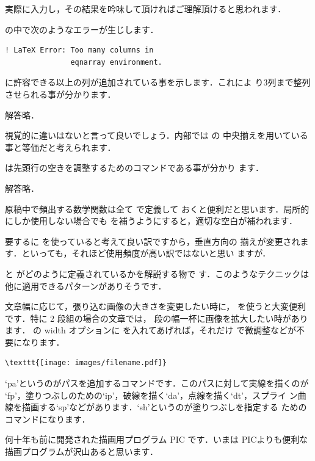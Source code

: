 \begin{description}
実際に入力し，その結果を吟味して頂ければご理解頂けると思われます．

の中で次のようなエラーが生じします．
\begin{verbatim}
! LaTeX Error: Too many columns in 
               eqnarray environment.
\end{verbatim}
 に許容できる以上の列が追加されている事を示します．これによ
 り3列まで整列させられる事が分かります．

解答略．

視覚的に違いはないと言って良いでしょう．内部では の
中央揃えを用いている事と等価だと考えられます．

 は先頭行の空きを調整するためのコマンドである事が分かり
 ます．

解答略．

原稿中で頻出する数学関数は全て  で定義して
おくと便利だと思います．局所的にしか使用しない場合でも 
を補うようにすると，適切な空白が補われます．

 要するに を使っていると考えて良い訳ですから，垂直方向の
 揃えが変更されます．といっても，それほど使用頻度が高い訳ではないと思い
 ますが．
\end{description}

\begin{description}
 と  がどのように定義されているかを解説する物で
す．このようなテクニックは他に適用できるパターンがありそうです．

 文章幅に応じて，張り込む画像の大きさを変更したい時に，
 を使うと大変便利です．特に 2 段組の場合の文章では，
段の幅一杯に画像を拡大したい時があります．
の width オプションに  を入れてあげれば，それだけ
で微調整などが不要になります．
\begin{verbatim}
\texttt{[image: images/filename.pdf]}
\end{verbatim}

`pa'というのがパスを追加するコマンドです．このパスに対して実線を描くのが
 `fp'，塗りつぶしのための`ip'，破線を描く`da'，点線を描く`dt'，スプライ
 ン曲線を描画する`sp'などがあります．`sh'というのが塗りつぶしを指定する
 ためのコマンドになります．

何十年も前に開発された描画用プログラム \textsc{PIC} です．いまは
\textsc{PIC}よりも便利な描画プログラムが沢山あると思います．
\end{description}

